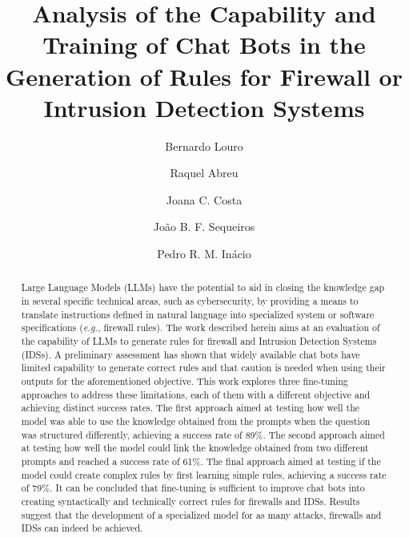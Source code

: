 \documentclass[sigconf]{acmart}
\begin{document}
\title{Analysis of the Capability and Training of Chat Bots in the Generation of Rules for Firewall or Intrusion Detection Systems}

\author{Bernardo Louro}

\author{Raquel Abreu}


\author{Joana C. Costa}


\author{João B. F. Sequeiros}

\author{Pedro R. M. Inácio}

\renewcommand{\shortauthors}{Trovato et al.}

\begin{abstract}
Large Language Models (LLMs) have the potential to aid in closing the knowledge gap in several specific technical areas, such as cybersecurity, by providing a means to translate instructions defined in natural language into specialized system or software specifications (\textit{e.g.}, firewall rules). The work described herein aims at an evaluation of the capability of LLMs to generate rules for firewall and Intrusion Detection Systems (IDSs). A preliminary assessment has shown that widely available chat bots have limited capability to generate correct rules and that caution is needed when using their outputs for the aforementioned objective. This work explores three fine-tuning approaches to address these limitations, each of them with a different objective and achieving distinct success rates. The first approach aimed at testing how well the model was able to use the knowledge obtained from the prompts when the question was structured differently, achieving a success rate of 89\%. The second approach aimed at testing how well the model could link the knowledge obtained from two different prompts and reached a success rate of 61\%. The final approach aimed at testing if the model could create complex rules by first learning simple rules, achieving a success rate of 79\%. It can be concluded that fine-tuning is sufficient to improve chat bots into creating syntactically and technically correct rules for firewalls and IDSs. Results suggest that the development of a specialized model for as many attacks, firewalls and IDSs can indeed be achieved.
\end{abstract}
\end{document}
